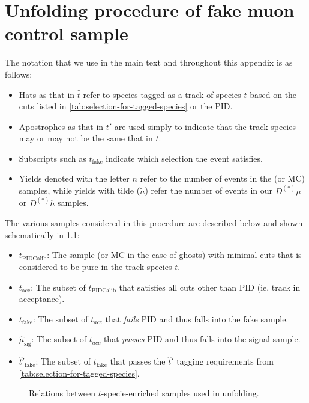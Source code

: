 \chapter{Unfolding procedure of fake muon control sample}
\label{appx:unfold-tech}

The notation that we use in the main text and throughout this appendix is as follows:

\begin{itemize}
\item Hats as that in $\hat{t}$ refer to species tagged as a track of species $t$ based
  on the cuts listed in \cref{tab:selection-for-tagged-species} or the \muon PID.
\item Apostrophes as that in $t'$ are used simply to indicate that the track species may or may not
  be the same that in $t$.
\item Subscripts such as $t_\text{fake}$ indicate which selection the event satisfies.
\item Yields denoted with the letter $n$ refer to the number of events in the \pidcalib (or MC) samples, while
  yields with tilde ($\tilde{n}$) refer the number of events in our $D^{(*)}\mu$ or $D^{(*)}h$ samples.
\end{itemize}

The various samples considered in this procedure are described below and shown
schematically in \cref{fig:relation-unfolding-sets}:

\begin{itemize}
\item $t_\text{PIDCalib}$: The \pidcalib sample (or MC in the case of ghosts) with minimal cuts
  that is considered to be pure in the track species $t$.
\item $t_\text{acc}$: The subset of $t_\text{PIDCalib}$ that satisfies all \muon
cuts other than PID (ie, track in \muon acceptance).
\item $t_\text{fake}$: The subset of $t_{acc}$ that \emph{fails} \muon PID and thus falls
  into the fake \muon sample.
\item $\hat{\mu}_\text{sig}$: The subset of $t_{acc}$ that \emph{passes} \muon PID
  and thus falls into the signal sample.
\item $\hat{t}'_\text{fake}$: The subset of $t_\text{fake}$ that passes the $\hat{t}'$ tagging requirements
  from \cref{tab:selection-for-tagged-species}.
\end{itemize}

\begin{figure}[ht]
    \centering
    \resizebox{0.9\columnwidth}{!}{
        
    }
    \caption{Relations between $t$-specie-enriched samples used in unfolding.}
    \label{fig:relation-unfolding-sets}
\end{figure}


